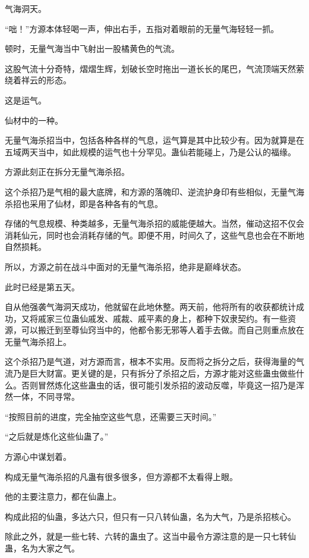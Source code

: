 
\begin{this_body}

气海洞天。

“咄！”方源本体轻喝一声，伸出右手，五指对着眼前的无量气海轻轻一抓。

顿时，无量气海当中飞射出一股橘黄色的气流。

这股气流十分奇特，熠熠生辉，划破长空时拖出一道长长的尾巴，气流顶端天然萦绕着祥云的形态。

这是运气。

仙材中的一种。

无量气海杀招当中，包括各种各样的气息，运气算是其中比较少有。因为就算是在五域两天当中，如此规模的运气也十分罕见。蛊仙若能碰上，乃是公认的福缘。

方源此刻正在拆分无量气海杀招。

这个杀招乃是气相的最大底牌，和方源的落魄印、逆流护身印有些相似，无量气海杀招也采用了仙材，即是各种各有的气息。

存储的气息规模、种类越多，无量气海杀招的威能便越大。当然，催动这招不仅会消耗仙元，同时也会消耗存储的气。即便不用，时间久了，这些气息也会在不断地自然损耗。

所以，方源之前在战斗中面对的无量气海杀招，绝非是巅峰状态。

此时已经是第五天。

自从他强袭气海洞天成功，他就留在此地休整。两天前，他将所有的收获都统计成功，又将戚家三位蛊仙戚发、戚裁、戚平素的身上，都种下奴隶契约。有一些资源，可以搬迁到至尊仙窍当中的，他都令影无邪等人着手去做。而自己则重点放在无量气海杀招上。

这个杀招乃是气道，对方源而言，根本不实用。反而将之拆分之后，获得海量的气流乃是巨大财富。更关键的是，只有拆分了杀招之后，方源才能对这些蛊虫做些什么。否则冒然炼化这些蛊虫的话，很可能引发杀招的波动反噬，毕竟这一招乃是浑然一体，不同寻常。

“按照目前的进度，完全抽空这些气息，还需要三天时间。”

“之后就是炼化这些仙蛊了。”

方源心中谋划着。

构成无量气海杀招的凡蛊有很多很多，但方源都不太看得上眼。

他的主要注意力，都在仙蛊上。

构成此招的仙蛊，多达六只，但只有一只八转仙蛊，名为大气，乃是杀招核心。

除此之外，就是一些七转、六转的蛊虫了。这当中最令方源注意的是一只七转仙蛊，名为大家之气。


\end{this_body}
